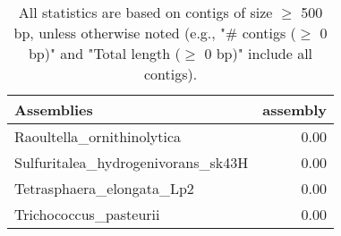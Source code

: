 \documentclass[12pt,a4paper]{article}
\begin{document}
\begin{table}[ht]
\begin{center}
\caption{All statistics are based on contigs of size $\geq$ 500 bp, unless otherwise noted (e.g., "\# contigs ($\geq$ 0 bp)" and "Total length ($\geq$ 0 bp)" include all contigs).}
\begin{tabular}{|l*{1}{|r}|}
\hline
Assemblies & assembly \\ \hline
Raoultella\_ornithinolytica & 0.00 \\ \hline
Sulfuritalea\_hydrogenivorans\_sk43H & 0.00 \\ \hline
Tetrasphaera\_elongata\_Lp2 & 0.00 \\ \hline
Trichococcus\_pasteurii & 0.00 \\ \hline
\end{tabular}
\end{center}
\end{table}
\end{document}
